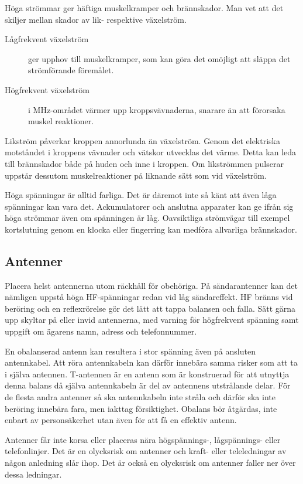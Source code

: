Höga strömmar ger häftiga muskelkramper och brännskador.
Man vet att det skiljer mellan skador av lik- respektive växelström.

\begin{description}
\item[Lågfrekvent växelström] ger upphov till muskelkramper, som kan göra det
omöjligt att släppa det strömförande föremålet.

\item[Högfrekvent växelström] i MHz-området värmer upp kroppsvävnaderna,
snarare än att förorsaka muskel reaktioner.
\end{description}

Likström påverkar kroppen annorlunda än växelström.
Genom det elektriska motståndet i kroppens vävnader och vätskor utvecklas det
värme.
Detta kan leda till brännskador både på huden och inne i kroppen.
Om likströmmen pulserar uppstår dessutom muskelreaktioner på liknande sätt som
vid växelström.

Höga spänningar är alltid farliga.
Det är däremot inte så känt att även låga spänningar kan vara det.
Ackumulatorer och anslutna apparater kan ge ifrån sig höga strömmar även om
spänningen är låg.
Oavsiktliga strömvägar till exempel kortslutning genom en klocka eller
fingerring kan medföra allvarliga brännskador.

\subsection{Antenner}

Placera helst antennerna utom räckhåll för obehöriga.
På sändarantenner kan det nämligen uppstå höga HF-spänningar redan vid
låg sändareffekt.
HF bränns vid beröring och en reflexrörelse gör det lätt att tappa balansen och
falla.
Sätt gärna upp skyltar på eller invid antennerna, med varning för högfrekvent
spänning samt uppgift om ägarens namn, adress och telefonnummer.

En obalanserad antenn kan resultera i stor spänning även på ansluten
antennkabel.
Att röra antennkabeln kan därför innebära samma risker som att ta i själva
antennen.
T-antennen är en antenn som är konstruerad för att utnyttja denna balans då
själva antennkabeln är del av antennens utstrålande delar.
För de flesta andra antenner så ska antennkabeln inte stråla och därför ska inte
beröring innebära fara, men iakttag försiktighet.
Obalans bör åtgärdas, inte enbart av personsäkerhet utan även för att få en
effektiv antenn.

Antenner får inte korsa eller placeras nära hög\-spännings-, låg\-spännings- eller
telefonlinjer.
Det är en olycksrisk om antenner och kraft- eller teleledningar av någon
anledning slår ihop.
Det är också en olycksrisk om antenner faller ner över dessa ledningar.


